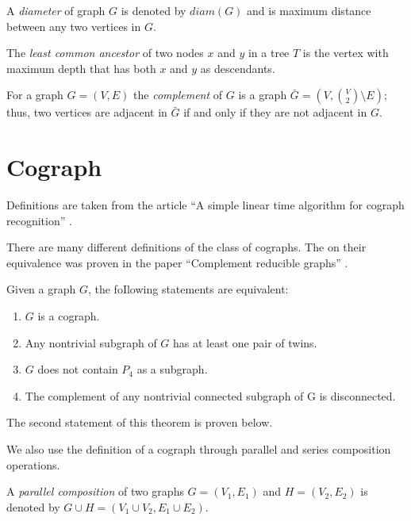 \begin{definition}[Diameter]
    A \emph{diameter} of graph $G$ is denoted by $diam(G)$ and is maximum distance between any two vertices in $G$. 
\end{definition}

\begin{definition}
The \emph{least common ancestor} of two nodes $x$ and $y$ in a tree $T$ is the vertex with maximum depth that has both $x$ and $y$ as descendants.
\end{definition}

\begin{definition}[Complement]
  For a graph $G = (V, E)$ the \emph{complement} of $G$ is a graph $\bar{G} = (V, {V \choose 2} \setminus E)$; thus, two vertices are adjacent in $\bar{G}$ if and only if they are not adjacent in $G$.
\end{definition}



\section{Cograph}
Definitions are taken from the article ``A simple linear time algorithm for cograph recognition'' \cite{HABIB2005183}.

There are many different definitions of the class of cographs. The  on their equivalence was proven in the paper ``Complement reducible graphs'' \cite{CORNEIL1981163}.

\begin{theorem}
Given a graph $G$, the foIlowing statements are equivalent:
\begin{enumerate}
    \item  $G$ is a cograph.
    \item  Any nontrivial subgraph of $G$ has at least one pair of twins.
    \item $G$ does not contain $P_4$ as a subgraph.
    \item The complement of any nontrivial connected subgraph of G is disconnected.
\end{enumerate}
\label{Fundamental theorem}
\end{theorem}
The second statement of this theorem is proven below.

We also use the definition of a cograph through parallel and series composition operations.

\begin{definition}
    A \emph{parallel composition} of two graphs $G=(V_1,E_1)$ and $H=(V_2,E_2)$ is denoted by $G \cup H = (V_1 \cup V_2, E_1 \cup E_2)$.
\end{definition}

